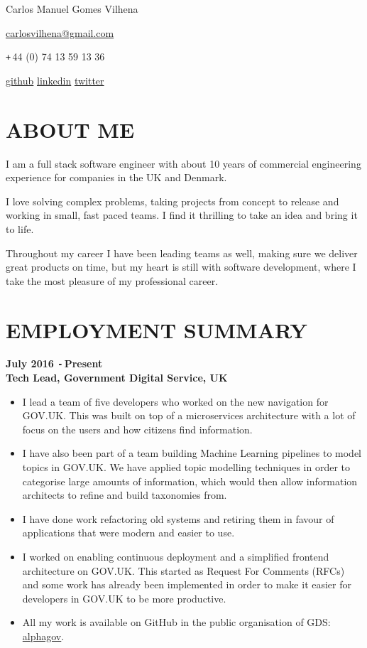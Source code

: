 \documentclass{res}
\def\Plus{\texttt{+}\,}
\def\Minus{\texttt{-}\,}
\begin{document}
\thispagestyle{empty}
\centerline{Carlos Manuel Gomes Vilhena}
\vspace{0.1in}
\centerline{
  \href{mailto:carlosvilhena@gmail.com}{carlosvilhena@gmail.com}
}
\centerline{\Plus 44 (0) 74 13 59 13 36}
\centerline{
  \href{http://github.com/carvil}{github} \hspace{0.5 cm}
  \href{http://www.linkedin.com/in/carlosvilhena}{linkedin}  \hspace{0.5 cm}
  \href{http://www.twitter.com/carvil_}{twitter}
}

\begin{resume}

\section{ABOUT ME}
I am a full stack software engineer with about 10 years of commercial engineering
experience for companies in the UK and Denmark.

I love solving complex problems, taking projects from concept to release and
working in small, fast paced teams. I find it thrilling to take an idea and
bring it to life.

Throughout my career I have been leading teams as well, making sure we deliver
great products on time, but my heart is still with software development, where
I take the most pleasure of my professional career.

\vspace{0.1in}
\section{EMPLOYMENT SUMMARY}
\vspace{0.1in}
  {\bf July 2016 \Minus Present}\\
  {\bf Tech Lead, Government Digital Service, UK}
    \begin{itemize}
      \item[] I lead a team of five developers who worked on the new navigation
        for GOV.UK. This was built on top of a microservices architecture with a
        lot of focus on the users and how citizens find information.
      \item[] I have also been part of a team building Machine Learning
        pipelines to model topics in GOV.UK. We have applied topic modelling
        techniques in order to categorise large amounts of information, which
        would then allow information architects to refine and build taxonomies
        from.
      \item[] I have done work refactoring old systems and retiring them in
        favour of applications that were modern and easier to use.
      \item[] I worked on enabling continuous deployment and a
        simplified frontend architecture on GOV.UK. This started as Request For
        Comments (RFCs) and some work has already been implemented in order to
        make it easier for developers in GOV.UK to be more productive.
      \item[] All my work is available on GitHub in the public organisation of
        GDS: \href{https://github.com/alphagov}{alphagov}.
    \end{itemize}


\end{resume}
\end{document}
